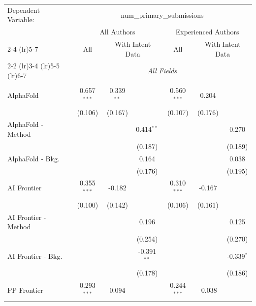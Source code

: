 \begingroup
\centering
\begin{tabular}{lcccccc}
   \tabularnewline \midrule \midrule
   Dependent Variable: & \multicolumn{6}{c}{num\_primary\_submissions}\\
 & \multicolumn{3}{c}{All Authors} & \multicolumn{3}{c}{Experienced Authors} \\
\cmidrule(lr){2-4} \cmidrule(lr){5-7}
 & \multicolumn{1}{c}{All} & \multicolumn{2}{c}{With Intent Data} & \multicolumn{1}{c}{All} & \multicolumn{2}{c}{With Intent Data} \\
\cmidrule(lr){2-2} \cmidrule(lr){3-4} \cmidrule(lr){5-5} \cmidrule(lr){6-7}
 & \multicolumn{6}{c}{\textit{All Fields}} \\ \\
   AlphaFold            & 0.657$^{***}$ & 0.339$^{**}$ &               & 0.560$^{***}$ & 0.204   &   \\   
                        & (0.106)       & (0.167)      &               & (0.107)       & (0.176) &   \\   
   AlphaFold - Method   &               &              & 0.414$^{**}$  &               &         & 0.270\\   
                        &               &              & (0.187)       &               &         & (0.189)\\   
   AlphaFold - Bkg.     &               &              & 0.164         &               &         & 0.038\\   
                        &               &              & (0.176)       &               &         & (0.195)\\   
   AI Frontier          & 0.355$^{***}$ & -0.182       &               & 0.310$^{***}$ & -0.167  &   \\   
                        & (0.100)       & (0.142)      &               & (0.106)       & (0.161) &   \\   
   AI Frontier - Method &               &              & 0.196         &               &         & 0.125\\   
                        &               &              & (0.254)       &               &         & (0.270)\\   
   AI Frontier - Bkg.   &               &              & -0.391$^{**}$ &               &         & -0.339$^{*}$\\   
                        &               &              & (0.178)       &               &         & (0.186)\\   
   PP Frontier          & 0.293$^{***}$ & 0.094        &               & 0.244$^{***}$ & -0.038  &   \\   

\end{tabular}
